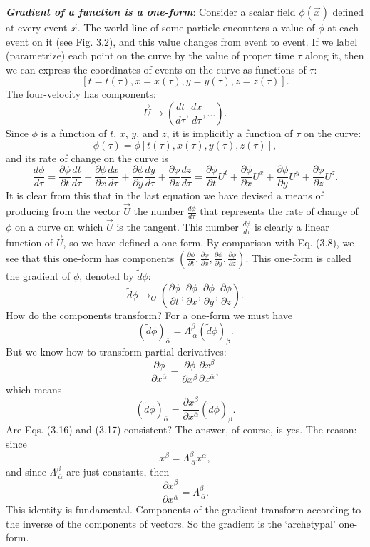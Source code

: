 \documentclass[12pt]{book}
\begin{document}
    \textit{\textbf{Gradient of a function is a one-form}}: Consider a scalar field \(\phi(\vec{x})\) defined at every event \(\vec{x}\). The world line of some particle encounters a value of \(\phi\) at each event on it (see Fig. 3.2), and this value changes from event to event. If we label (parametrize) each point on the curve by the value of proper time \(\tau\) along it, then we can express the coordinates of events on the curve as functions of \(\tau\):
    \[
    [t = t(\tau), x = x(\tau), y = y(\tau), z = z(\tau)].
    \]
    The four-velocity has components:
    \[
    \vec{U} \rightarrow \left(\frac{d t}{d\tau}, \frac{d x}{d\tau}, \ldots\right).
    \]
    Since \(\phi\) is a function of \(t\), \(x\), \(y\), and \(z\), it is implicitly a function of \(\tau\) on the curve:
    \[
    \phi(\tau) = \phi[t(\tau), x(\tau), y(\tau), z(\tau)],
    \]
    and its rate of change on the curve is
    \[
    \frac{d\phi}{d\tau} = \frac{\partial \phi}{\partial t} \frac{d t}{d\tau}
    + \frac{\partial \phi}{\partial x} \frac{d x}{d\tau}
    + \frac{\partial \phi}{\partial y} \frac{d y}{d\tau}
    + \frac{\partial \phi}{\partial z} \frac{d z}{d\tau}
    = \frac{\partial \phi}{\partial t} U^t + \frac{\partial \phi}{\partial x} U^x + \frac{\partial \phi}{\partial y} U^y + \frac{\partial \phi}{\partial z} U^z. \tag{3.14}
    \]
    It is clear from this that in the last equation we have devised a means of producing from the vector \(\vec{U}\) the number \( \frac{d\phi}{d\tau} \) that represents the rate of change of \(\phi\) on a curve on which \(\vec{U}\) is the tangent. This number \( \frac{d\phi}{d\tau} \) is clearly a linear function of \(\vec{U}\), so we have defined a one-form. 
    By comparison with Eq. (3.8), we see that this one-form has components \(\left(\frac{\partial \phi}{\partial t}, \frac{\partial \phi}{\partial x}, \frac{\partial \phi}{\partial y}, \frac{\partial \phi}{\partial z}\right)\). This one-form is called the gradient of \(\phi\), denoted by \(\tilde{d}\phi\):
    \[
    \tilde{d}\phi \rightarrow_O \left(\frac{\partial \phi}{\partial t}, \frac{\partial \phi}{\partial x}, \frac{\partial \phi}{\partial y}, \frac{\partial \phi}{\partial z}\right). \tag{3.15}
    \]
    How do the components transform? For a one-form we must have
    \[
    (\tilde{d}\phi)_{\bar{\alpha}} = \Lambda^\beta_{\ \bar{\alpha}} (\tilde{d}\phi)_\beta. \tag{3.16}
    \]
    But we know how to transform partial derivatives:
    \[
    \frac{\partial \phi}{\partial x^{\bar{\alpha}}} = \frac{\partial \phi}{\partial x^\beta} \frac{\partial x^\beta}{\partial x^{\bar{\alpha}}},
    \]
    which means
    \[
    (\tilde{d}\phi)_{\bar{\alpha}} = \frac{\partial x^\beta}{\partial x^{\bar{\alpha}}} (\tilde{d}\phi)_\beta. \tag{3.17}
    \]
    Are Eqs. (3.16) and (3.17) consistent? The answer, of course, is yes. The reason: since
    \[
    x^\beta = \Lambda^\beta_{\ \bar{\alpha}} x^{\bar{\alpha}},
    \]
    and since \(\Lambda^\beta_{\ \bar{\alpha}}\) are just constants, then
    \[
    \frac{\partial x^\beta}{\partial x^{\bar{\alpha}}} = \Lambda^\beta_{\ \bar{\alpha}}. \tag{3.18}
    \]
    This identity is fundamental. Components of the gradient transform according to the inverse of the components of vectors. So the gradient is the ‘archetypal’ one-form.
\end{document}
